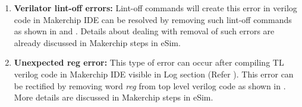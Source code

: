 \begin{enumerate}
\item \textbf{Verilator lint-off errors:} Lint-off commands will create this error in verilog code in Makerchip IDE can be resolved by removing such lint-off commands as shown in  and . Details about dealing with removal of such errors are already discussed in Makerchip steps in eSim. 

\item \textbf{Unexpected reg error:} This type of error can occur after compiling TL verilog code in Makerchip IDE visible in Log section (Refer ). This error can be rectified by removing word \textit{reg} from top level verilog code as shown in . More details are discussed in Makerchip steps in eSim. 

\end{enumerate}



